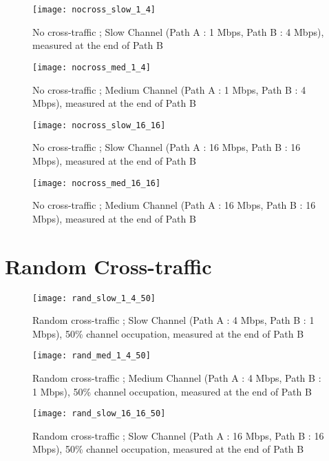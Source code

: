 \begin{figure}[!h]
\centering
\texttt{[image: nocross\_slow\_1\_4]}
\caption{No cross-traffic ; Slow Channel (Path A : 1 Mbps, Path B : 4 Mbps), measured at the end of Path B}
\end{figure}
\clearpage

\begin{figure}[!h]
\centering
\texttt{[image: nocross\_med\_1\_4]}
\caption{No cross-traffic ; Medium Channel (Path A : 1 Mbps, Path B : 4 Mbps), measured at the end of Path B}
\end{figure}



\begin{figure}[!h]
\centering
\texttt{[image: nocross\_slow\_16\_16]}
\caption{No cross-traffic ; Slow Channel (Path A : 16 Mbps, Path B : 16 Mbps), measured at the end of Path B}
\end{figure}

\begin{figure}[!h]
\centering
\texttt{[image: nocross\_med\_16\_16]}
\caption{No cross-traffic ; Medium Channel (Path A : 16 Mbps, Path B : 16 Mbps), measured at the end of Path B}
\end{figure}

\clearpage

\section{Random Cross-traffic}

\begin{figure}[!h]
\centering
\texttt{[image: rand\_slow\_1\_4\_50]}
\caption{Random cross-traffic ; Slow Channel (Path A : 4 Mbps, Path B : 1 Mbps), 50\% channel occupation, measured at the end of Path B}
\end{figure}
\clearpage

\begin{figure}[!h]
\centering
\texttt{[image: rand\_med\_1\_4\_50]}
\caption{Random cross-traffic ; Medium Channel (Path A : 4 Mbps, Path B : 1 Mbps), 50\% channel occupation, measured at the end of Path B}
\end{figure}

\begin{figure}[!h]
\centering
\texttt{[image: rand\_slow\_16\_16\_50]}
\caption{Random cross-traffic ; Slow Channel (Path A : 16 Mbps, Path B : 16 Mbps), 50\% channel occupation, measured at the end of Path B}
\end{figure}

